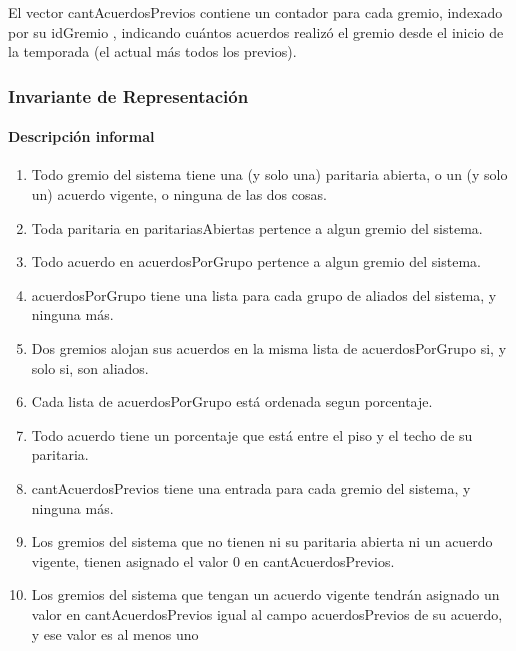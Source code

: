 	El vector cantAcuerdosPrevios contiene un contador para cada gremio, indexado por su idGremio , indicando cu\'antos acuerdos realizó el gremio desde el inicio de la temporada (el actual más todos los previos).



\subsubsection{Invariante de Representaci\'on}

\paragraph{Descripci\'on informal}
\begin{enumerate}

	\item Todo gremio del sistema tiene una (y solo una) paritaria abierta, o un (y solo un) acuerdo vigente, o ninguna de las dos cosas.
	\item Toda paritaria en paritariasAbiertas pertence a algun gremio del sistema.
	\item Todo acuerdo en acuerdosPorGrupo pertence a algun gremio del sistema.
	\item acuerdosPorGrupo tiene una lista para cada grupo de aliados del sistema, y ninguna m\'as.
	\item Dos gremios alojan sus acuerdos en la misma lista de acuerdosPorGrupo si, y solo si, son aliados.
	\item Cada lista de acuerdosPorGrupo est\'a ordenada segun porcentaje.
	\item Todo acuerdo tiene un porcentaje que est\'a entre el piso y el techo de su paritaria.
	\item cantAcuerdosPrevios tiene una entrada para cada gremio del sistema, y ninguna m\'as.
	\item Los gremios del sistema que no tienen ni su paritaria abierta ni un acuerdo vigente, tienen asignado el valor 0 en cantAcuerdosPrevios.
	\item Los gremios del sistema que tengan un acuerdo vigente tendr\'an asignado un valor en cantAcuerdosPrevios igual al campo acuerdosPrevios de su acuerdo, y  ese valor es al menos uno


\end{enumerate}


